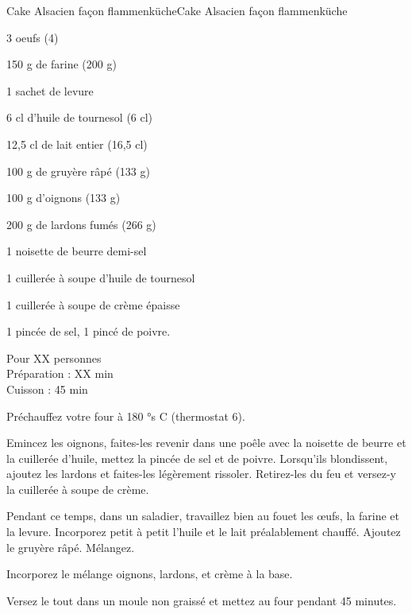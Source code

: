 \begin{recette}{Cake Alsacien façon flammenküche}{Cake Alsacien façon flammenküche}

\begin{ingredients}
3 oeufs (4)\par
150 g de farine (200 g)\par
1 sachet de levure\par
6 cl d’huile de tournesol (6 cl)\par
12,5 cl de lait entier (16,5 cl)\par
100 g de gruyère râpé (133 g)\par
100 g d’oignons (133 g)\par
200 g de lardons fumés (266 g)\par
1 noisette de beurre demi-sel\par
1 cuillerée à soupe d’huile de tournesol\par
1 cuillerée à soupe de crème épaisse\par
1 pincée de sel, 1 pincé de poivre.\par
\end{ingredients}

\begin{infos}
Pour XX personnes\\
Préparation : XX min\\
Cuisson : 45 min\\
\end{infos}

\begin{etapes}
\item Préchauffez votre four à 180 °s C (thermostat 6).
\item Emincez les oignons, faites-les revenir dans une poêle avec la noisette de beurre et la cuillerée d’huile, mettez la pincée de sel et de poivre. Lorsqu’ils blondissent, ajoutez les lardons et faites-les légèrement rissoler. Retirez-les du feu et versez-y la cuillerée à soupe de crème.
\item Pendant ce temps, dans un saladier, travaillez bien au fouet les œufs, la farine et la levure. Incorporez petit à petit l’huile et le lait préalablement chauffé. Ajoutez le gruyère râpé. Mélangez.
\item Incorporez le mélange oignons, lardons, et crème à la base.
\item Versez le tout dans un moule non graissé et mettez au four pendant 45 minutes.
\end{etapes}

\end{recette}